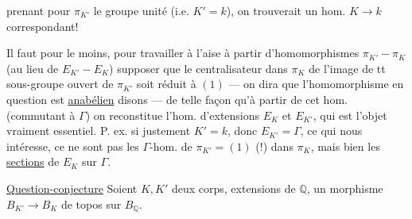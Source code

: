 prenant pour $\pi_{K'}$ le groupe unité (i.e. $K'=k$), on trouverait un hom. $K\longrightarrow k$ correspondant!

Il faut pour le moins, pour travailler à l'aise à partir d'homomorphismes $\pi_{K'}-\pi_K$ (au lieu de $E_{K'}-E_K$) supposer que le centralisateur dans $\pi_K$ de l'image de tt sous-groupe ouvert de $\pi_{K'}$ soit réduit à $(1)$ --- on dira que l'homomorphisme en question est \uline{anabélien} disons --- de telle façon qu'à partir de cet hom. (commutant à $\Gamma$) on reconstitue l'hom. d'extensions $E_K$ et $E_{K'}$, qui est l'objet vraiment essentiel. P. ex. si justement $K'=k$, donc $E_{K'}=\Gamma$, ce qui nous intéresse, ce ne sont pas les $\Gamma$-hom. de $\pi_{K'}=(1)$ (!) dans $\pi_K$, mais bien les \uline{sections} de $E_K$ sur $\Gamma$.

\uline{Question-conjecture} Soient $K,K'$ deux corps, extensions   de $\mathbb Q$,   un morphisme $B_{K'}\longrightarrow B_K$ de topos sur $B_{\mathbb Q}$.
